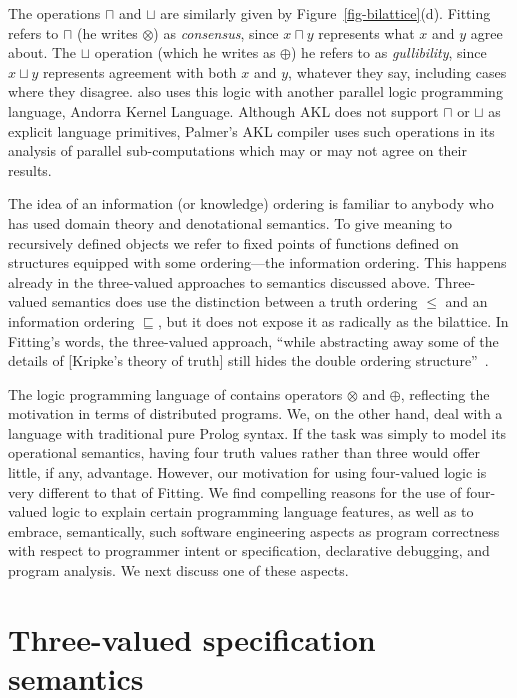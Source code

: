 \documentclass{tlp}
\begin{document}
\noindent
The operations $\sqcap$ and $\sqcup$ are similarly given by 
Figure~\ref{fig-bilattice}(d).
Fitting refers to $\sqcap$ (he writes $\otimes$) as \emph{consensus},
since $x \sqcap y$ represents what $x$ and $y$ agree about.
The $\sqcup$ operation (which he writes as $\oplus$) he refers to as
\emph{gullibility}, since $x \sqcup y$ represents agreement with both
$x$ and $y$, whatever they say, including cases where they disagree.
 also uses this logic with another parallel logic
programming language, Andorra Kernel Language.  Although AKL does not
support $\sqcap$ or $\sqcup$ as explicit language primitives, Palmer's
AKL compiler uses such operations in its analysis of parallel
sub-computations which may or may not agree on their results.


The idea of an information (or knowledge) ordering is familiar to anybody
who has used domain theory and denotational semantics.
To give meaning to recursively defined objects we refer to fixed points
of functions defined on structures equipped with some ordering---the
information ordering.
This happens already in the three-valued approaches to semantics
discussed above. 
Three-valued semantics does use the
distinction between a truth ordering $\leq$ and an information ordering
$\sqsubseteq$, but it does not expose it as radically as the bilattice.
In Fitting's words, the three-valued approach, ``while abstracting away
some of the details of [Kripke's theory of truth] still hides the
double ordering structure''~\cite{fitting:2006}.

The logic programming language of  contains
operators $\otimes$ and $\oplus$, reflecting the motivation in terms of
distributed programs.
We, on the other hand, deal with a language with traditional pure 
Prolog syntax. 
If the task was simply to model its operational semantics,
having four truth values rather than three would offer little, if any,
advantage.
However, our motivation for using four-valued logic is very different
to that of Fitting.
We find compelling reasons for the use of four-valued logic 
to explain certain programming language features, as well as to
embrace, semantically, such software engineering aspects as
program correctness with respect to programmer intent or specification,
declarative debugging, and program analysis.
We next discuss one of these aspects.

\section{Three-valued specification semantics}
\label{sec-intentional}
\end{document}
